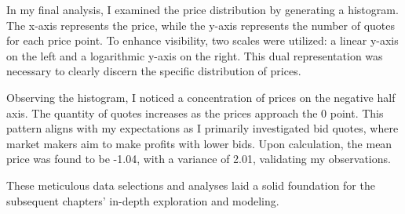 In my final analysis, I examined the price distribution by generating a histogram. The x-axis represents the price, while the y-axis represents the number of quotes for each price point. To enhance visibility, two scales were utilized: a linear y-axis on the left and a logarithmic y-axis on the right. This dual representation was necessary to clearly discern the specific distribution of prices.

Observing the histogram, I noticed a concentration of prices on the negative half axis. The quantity of quotes increases as the prices approach the 0 point. This pattern aligns with my expectations as I primarily investigated bid quotes, where market makers aim to make profits with lower bids. Upon calculation, the mean price was found to be -1.04, with a variance of 2.01, validating my observations.

These meticulous data selections and analyses laid a solid foundation for the subsequent chapters' in-depth exploration and modeling.
